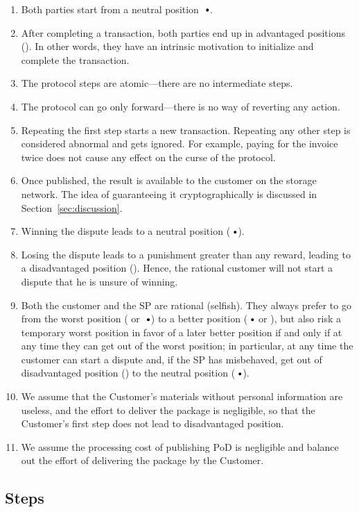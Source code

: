 \documentclass[pdftex,twocolumn,epjc3]{svjour3}
\begin{document}
{\begin{enumerate}
\item Both parties start from a neutral position $\neutral$.
\item After completing a transaction, both parties end up in advantaged positions (\plus{}). In other words, they have an intrinsic motivation to initialize and complete the transaction.
\item The protocol steps are atomic—there are no intermediate steps.
\item The protocol can go only forward—there is no way of reverting any action.
\item Repeating the first step starts a new transaction. Repeating any other step is considered abnormal and gets ignored. For example, paying for the invoice twice does not cause any effect on the curse of the protocol.
\item Once published, the result is available to the customer on the storage network. The idea of guaranteeing it cryptographically is discussed in Section~\ref{sec:discussion}.
\item Winning the dispute leads to a neutral position ($\neutral$).
\item Losing the dispute leads to a punishment greater than any reward, leading to a disadvantaged position (\minus{}). Hence, the rational customer will not start a dispute that he is unsure of winning.
\item Both the customer and the SP are rational (selfish). They always prefer to go from the worst position (\minus{} or $\neutral${}) to a better position ($\neutral$ or \plus), but also risk a temporary worst position in favor of a later better position if and only if at any time they can get out of the worst position; in particular, at any time the customer can start a dispute and, if the SP has misbehaved, get out of disadvantaged position (\minus) to the neutral position ($\neutral$).
\item We assume that the Customer's materials without personal information are useless, and the effort to deliver the package is negligible, so that the Customer's first step does not lead to disadvantaged position.
\item We assume the processing cost of publishing $\mathrm{PoD}$ is negligible and balance out the effort of delivering the package by the Customer.
\end{enumerate}

\subsection{Steps}\label{sec:steps}

}
\end{document}
